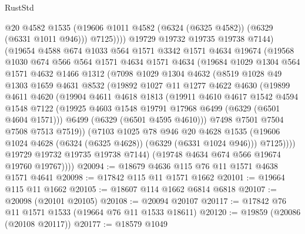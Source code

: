 \begin{lexlean}{RustStd}
\begin{coremodule}
{{                @20
                @4582
                @1535
                (@19606 @1011 @4582 (@6324 (@6325 @4582)) (@6329 (@6331 @1011 @946)))
                @7125))))
        @19729
        @19732
        @19735
        @19738
        @7144)
      (@19654
        @4588
        @674
        @1033
        @564
        @1571
        @3342
        @1571
        @4634
        @19674
        (@19568
          @1030
          @674
          @566
          @564
          @1571
          @4634
          @1571
          @4634
          (@19684
            @1029
            @1304
            @564
            @1571
            @4632
            @1466
            @1312
            (@7098
              @1029
              @1304
              @4632
              (@8519
                @1028
                @49
                @1303
                @1659
                @4631
                @8532
                (@19892
                  @1027
                  @11
                  @1277
                  @4622
                  @4630
                  (@19899
                    @4611
                    @4620
                    (@19904
                      @4611
                      @4618
                      @1813
                      (@19911
                        @4610
                        @4617
                        @1542
                        @4594
                        @1548
                        @7122
                        (@19925 @4603 @1548 @19791 @17968 @6499 (@6329 (@6501 @4604 @1571)))
                        @6499
                        (@6329 (@6501 @4595 @4610)))
                      @7498
                      @7501
                      @7504
                      @7508
                      @7513
                      @7519))
                  (@7103
                    @1025
                    @78
                    @946
                    @20
                    @4628
                    @1535
                    (@19606 @1024 @4628 (@6324 (@6325 @4628)) (@6329 (@6331 @1024 @946)))
                    @7125))))
            @19729
            @19732
            @19735
            @19738
            @7144)
          (@19748 @4634 @674 @566 @19674 @19760 @19767))))
@20094 := @18679 @4636 @115 @76 @11 @1571 @4638 @1571 @4641
@20098 := @17842 @115 @11 @1571 @1662
@20101 := @19664 @115 @11 @1662
@20105 := @18607 @114 @1662 @6814 @6818
@20107 := @20098 (@20101 @20105)
@20108 := @20094 @20107
@20117 := @17842 @76 @11 @1571 @1533 (@19664 @76 @11 @1533 @18611)
@20120 := @19859 (@20086 (@20108 @20117))
@20177 := @18579
    @1049
}}
\end{coremodule}
\end{lexlean}
